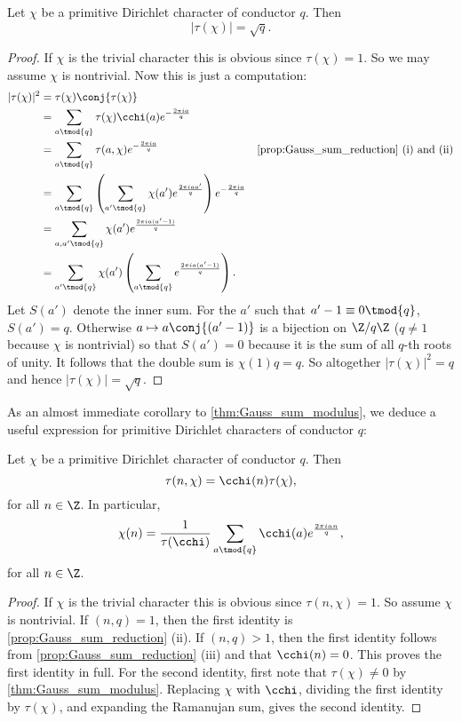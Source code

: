       \begin{theorem}\label{thm:Gauss_sum_modulus}
        Let $\chi$ be a primitive Dirichlet character of conductor $q$. Then
        \[
          |\tau(\chi)| = \sqrt{q}.
        \]
      \end{theorem}
      \begin{proof}
        If $\chi$ is the trivial character this is obvious since $\tau(\chi) = 1$. So we may assume $\chi$ is nontrivial. Now this is just a computation:
        \begin{align*}
          |\tau(\chi)|^{2} &= \tau(\chi)\conj{\tau(\chi)} \\
          &= \sum_{a \tmod{q}}\tau(\chi)\cchi(a)e^{-\frac{2\pi ia}{q}} \\
          &=  \sum_{a \tmod{q}}\tau(a,\chi)e^{-\frac{2\pi ia}{q}} & \text{\cref{prop:Gauss_sum_reduction} (i) and (ii)} \\
          &= \sum_{a \tmod{q}}\left(\sum_{a' \tmod{q}}\chi(a')e^{\frac{2\pi iaa'}{q}}\right)e^{-\frac{2\pi ia}{q}} \\
          &= \sum_{a,a' \tmod{q}}\chi(a')e^{\frac{2\pi ia(a'-1)}{q}} \\
          &= \sum_{a' \tmod{q}}\chi(a')\left(\sum_{a \tmod{q}}e^{\frac{2\pi ia(a'-1)}{q}}\right).
        \end{align*}
        Let $S(a')$ denote the inner sum. For the $a'$ such that $a'-1 \equiv 0 \tmod{q}$, $S(a') = q$. Otherwise $a \mapsto a\conj{(a'-1)}$ is a bijection on $\Z/q\Z$ ($q \neq 1$ because $\chi$ is nontrivial) so that $S(a') = 0$ because it is the sum of all $q$-th roots of unity. It follows that the double sum is $\chi(1)q = q$. So altogether $|\tau(\chi)|^{2} = q$ and hence $|\tau(\chi)| = \sqrt{q}$.
      \end{proof}

      As an almost immediate corollary to \cref{thm:Gauss_sum_modulus}, we deduce a useful expression for primitive Dirichlet characters of conductor $q$:

      \begin{corollary}\label{cor:gauss_sum_primitive_formula}
        Let $\chi$ be a primitive Dirichlet character of conductor $q$. Then
        \[
          \tau(n,\chi) = \cchi(n)\tau(\chi),
        \]
        for all $n \in \Z$. In particular,
        \[
          \chi(n) = \frac{1}{\tau(\cchi)}\sum_{a \tmod{q}}\cchi(a)e^{\frac{2\pi ian}{q}},
        \]
        for all $n \in \Z$.
      \end{corollary}
      \begin{proof}
        If $\chi$ is the trivial character this is obvious since $\tau(n,\chi) = 1$. So assume $\chi$ is nontrivial. If $(n,q) = 1$, then the first identity is \cref{prop:Gauss_sum_reduction} (ii). If $(n,q) > 1$, then the first identity follows from \cref{prop:Gauss_sum_reduction} (iii) and that $\cchi(n) = 0$. This proves the first identity in full. For the second identity, first note that $\tau(\chi) \neq 0$ by \cref{thm:Gauss_sum_modulus}. Replacing $\chi$ with $\cchi$, dividing the first identity by $\tau(\chi)$, and expanding the Ramanujan sum, gives the second identity.
      \end{proof}

